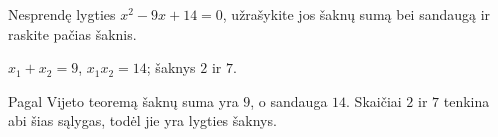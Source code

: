 \begin{salyga}
Nesprendę lygties $x^2 - 9x + 14 = 0$, užrašykite jos šaknų sumą bei sandaugą ir raskite pačias šaknis.
\end{salyga}

\begin{atsakymas}
$x_1+x_2=9$, $x_1x_2=14$; šaknys $2$ ir $7$.
\end{atsakymas}

\begin{sprendimas}
Pagal Vijeto teoremą šaknų suma yra $9$, o sandauga $14$. Skaičiai $2$ ir $7$ tenkina abi šias sąlygas, todėl jie yra lygties šaknys.
\end{sprendimas}
